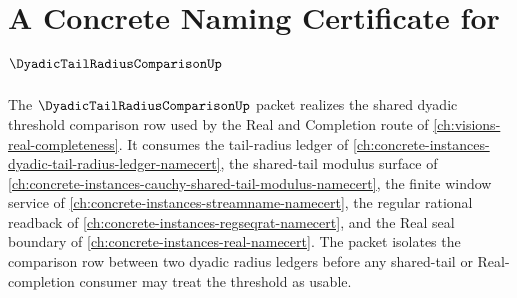 \chapter{A Concrete Naming Certificate for $\DyadicTailRadiusComparisonUp$}
\label{ch:concrete-instances-dyadic-tail-radius-comparison-namecert}

The $\DyadicTailRadiusComparisonUp$ packet realizes the shared dyadic threshold comparison row used by the Real and Completion route of \autoref{ch:visions-real-completeness}. It consumes the tail-radius ledger of \autoref{ch:concrete-instances-dyadic-tail-radius-ledger-namecert}, the shared-tail modulus surface of \autoref{ch:concrete-instances-cauchy-shared-tail-modulus-namecert}, the finite window service of \autoref{ch:concrete-instances-streamname-namecert}, the regular rational readback of \autoref{ch:concrete-instances-regseqrat-namecert}, and the Real seal boundary of \autoref{ch:concrete-instances-real-namecert}. The packet isolates the comparison row between two dyadic radius ledgers before any shared-tail or Real-completion consumer may treat the threshold as usable.

